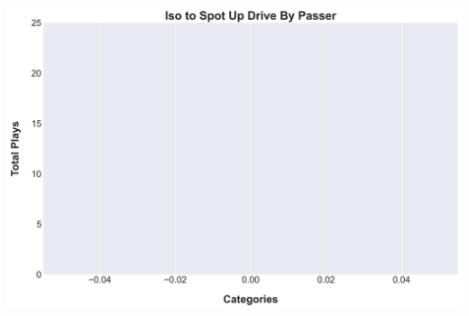 \documentclass[a4paper,12pt]{article}
\begin{document}
\begin{table}[H]
{\begin{minipage}[t]{0.6\textwidth}
{\begin{tabular}
                
                    
                
            
                
            
                
            
                
            
                
            
                
            
                
            
                
            
                
            
                
            
                
            
                
            
                
            
                
            
                
            
                
            
                
            
                
            

            \bottomrule
        \end{tabular}
        } %
    \end{minipage}
    } %
    \hfill %
    \begin{minipage}[c]{0.35\textwidth} %
        \flushright
        \includegraphics[width=\textwidth, height=.14\textheight]{images/SpotUp_IsoDrivesPlayer_Freq.png} %
    \end{minipage}
\end{table}
\end{document}
